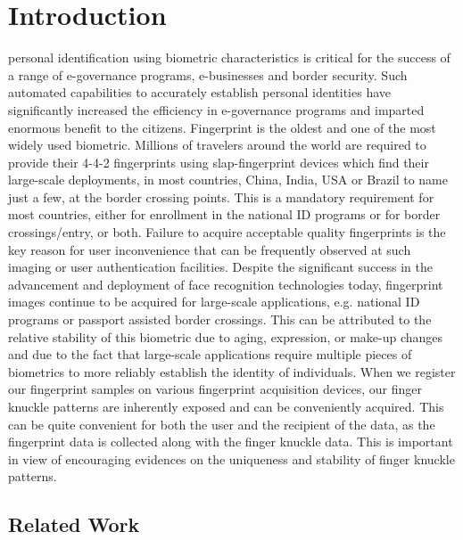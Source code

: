 \hiddenref{}

\section{Introduction\label{introduction}}

 personal identification using biometric characteristics is critical for the success of a range of e-governance programs, e-businesses and border security. Such automated capabilities to accurately establish personal identities have significantly increased the efficiency in e-governance programs and imparted enormous benefit to the citizens. Fingerprint is the oldest and one of the most widely used biometric. Millions of travelers around the world are required to provide their 4-4-2 fingerprints using slap-fingerprint devices which find their large-scale deployments, in most countries, China, India, USA or Brazil to name just a few, at the border crossing points. This is a mandatory requirement for most countries, either for enrollment in the national ID programs or for border crossings/entry, or both. Failure to acquire acceptable quality fingerprints is the key reason for user inconvenience that can be frequently observed at such imaging or user authentication facilities. Despite the significant success in the advancement and deployment of face recognition technologies today, fingerprint images continue to be acquired for large-scale applications, e.g. national ID programs or passport assisted border crossings. This can be attributed to the relative stability of this biometric due to aging, expression, or make-up changes and due to the fact that large-scale applications require multiple pieces of biometrics to more reliably establish the identity of individuals. When we register our fingerprint samples on various fingerprint acquisition devices, our finger knuckle patterns are inherently exposed and can be conveniently acquired. This can be quite convenient for both the user and the recipient of the data, as the fingerprint data is collected along with the finger knuckle data. This is important in view of encouraging evidences on the uniqueness \cite{cappelli2010minutia} and stability \cite{kumar2014importance} of finger knuckle patterns.

\subsection{Related Work\label{relate-work}}
